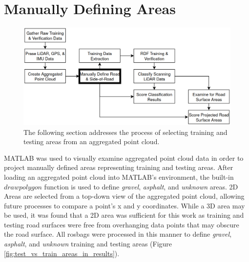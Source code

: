 \documentclass[numbered,pdftex]{ohio-etd}
\begin{document}
{	\section{Manually Defining Areas}\label{sec:manually_defining_areas}{
		
		\begin{figure}[H]
			\centering
			\includegraphics[width=0.9\linewidth]{Defense_Images/flowz_define_areas}
			\caption[Manually Defined Areas Flowchart Context]{The following section addresses the process of selecting training and testing areas from an aggregated point cloud.}
			\label{fig:flowz_define_areas}
		\end{figure}
		
		{MATLAB was used to visually examine aggregated point cloud data in order to project manually defined areas representing training and testing areas. After loading an aggregated point cloud into MATLAB's environment, the built-in $drawpolygon$ function is used to define \textit{gravel}, \textit{asphalt}, and \textit{unknown} areas. 2D Areas are selected from a top-down view of the aggregated point cloud, allowing future processes to compare a point's x and y coordinates. While a 3D area may be used, it was found that a 2D area was sufficient for this work as training and testing road surfaces were free from overhanging data points that may obscure the road surface. All rosbags were processed in this manner to define \textit{gravel}, \textit{asphalt}, and \textit{unknown} training and testing areas (Figure \ref{fig:test_vs_train_areas_in_results}).}
		
		
}}
\end{document}
